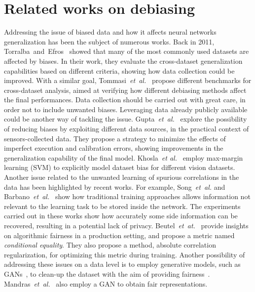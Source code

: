 \section{Related works on debiasing}
\label{sec:related}

Addressing the issue of biased data and how it affects neural networks generalization has been the subject of numerous works.
Back in 2011, Torralba~and~Efros~\cite{torralba2011unbiased} showed that many of the most commonly used datasets are affected by biases. In their work, they evaluate the cross-dataset generalization capabilities based on different criteria, showing how data collection could be improved. 
With a similar goal, Tommasi~\emph{et~al.}~\cite{tommasi2017deeper} propose different benchmarks for cross-dataset analysis, aimed at verifying how different debiasing methods affect the final performances.
Data collection should be carried out with great care, in order not to include unwanted biases. Leveraging data already publicly available could be another way of tackling the issue. Gupta~\emph{et~al.}~\cite{gupta2018robot} explore the possibility of reducing biases by exploiting different data sources, in the practical context of sensors-collected data. They propose a strategy to minimize the effects of imperfect execution and calibration errors, showing improvements in the generalization capability of the final model. 
Khosla~\emph{et al.}~\cite{Khosla2012UndoingTD} employ max-margin learning (SVM) to explicitly model dataset bias for different vision datasets.
Another issue related to the unwanted learning of spurious correlations in the data has been highlighted by recent works. For example, Song~\emph{et~al.} \cite{song2017machine} and Barbano~\emph{et~al.}~\cite{barbano2021bridging} show how traditional training approaches allows information not relevant to the learning task to be stored inside the network. The experiments carried out in these works show how accurately some side information can be recovered, resulting in a potential lack of privacy.
Beutel~\emph{et~at.}~\cite{beutel2019putting} provide insights on algorithmic fairness in a production setting, and propose a metric named \emph{conditional equality}. They also propose a method, absolute correlation regularization, for optimizing this metric during training.
Another possibility of addressing these issues on a data level is to employ generative models, such as GANs~\cite{goodfellow2014generative}, to clean-up the dataset with the aim of providing fairness~\cite{xu2018fairgan, sattigeri2018fairness}.
Mandras~\emph{et~al.}~\cite{madras2018learning} also employ a GAN to obtain fair representations.


